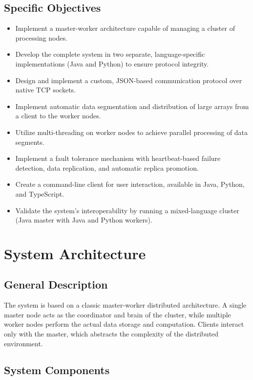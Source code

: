 \documentclass[10pt,a4paper]{article}
\theoremstyle{definition}
\theoremstyle{remark}
\begin{document}
\subsection{Specific Objectives}
\begin{itemize}
    \item Implement a master-worker architecture capable of managing a cluster of processing nodes.
    \item Develop the complete system in two separate, language-specific implementations (Java and Python) to ensure protocol integrity.
    \item Design and implement a custom, JSON-based communication protocol over native TCP sockets.
    \item Implement automatic data segmentation and distribution of large arrays from a client to the worker nodes.
    \item Utilize multi-threading on worker nodes to achieve parallel processing of data segments.
    \item Implement a fault tolerance mechanism with heartbeat-based failure detection, data replication, and automatic replica promotion.
    \item Create a command-line client for user interaction, available in Java, Python, and TypeScript.
    \item Validate the system's interoperability by running a mixed-language cluster (Java master with Java and Python workers).
\end{itemize}

\section{System Architecture}

\subsection{General Description}
The system is based on a classic master-worker distributed architecture. A single master node acts as the coordinator and brain of the cluster, while multiple worker nodes perform the actual data storage and computation. Clients interact only with the master, which abstracts the complexity of the distributed environment.

\subsection{System Components}
\end{document}
